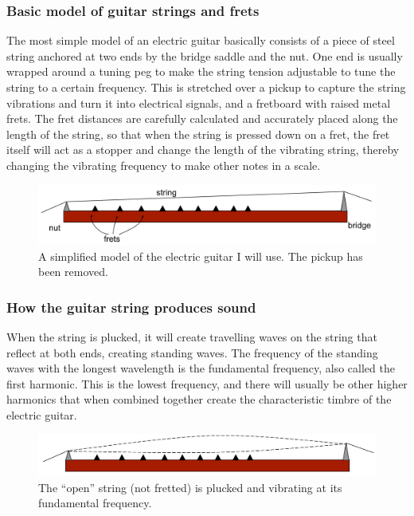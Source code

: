 \documentclass[11pt]{article}
\begin{document}
\begin{flushleft}
            \subsubsection*{Basic model of guitar strings and frets}
                The most simple model of an electric guitar basically consists of a piece of steel string anchored at two ends by the bridge saddle and the nut. One end is usually wrapped around a tuning peg to make the string tension adjustable to tune the string to a certain frequency. This is stretched over a pickup to capture the string vibrations and turn it into electrical signals, and a fretboard with raised metal frets. The fret distances are carefully calculated and accurately placed along the length of the string, so that when the string is pressed down on a fret, the fret itself will act as a stopper and change the length of the vibrating string, thereby changing the vibrating frequency to make other notes in a scale. 
                \begin{figure}[h]
                    \includegraphics[width=\textwidth]{fig1.png}
                    \caption{A simplified model of the electric guitar I will use. The pickup has been removed.}\label{fig1}
                \end{figure} 
                \FloatBarrier
            \subsubsection*{How the guitar string produces sound}
                When the string is plucked, it will create travelling waves on the string that reflect at both ends, creating standing waves. The frequency of the standing waves with the longest wavelength is the fundamental frequency, also called the first harmonic. This is the lowest frequency, and there will usually be other higher harmonics that when combined together create the characteristic timbre of the electric guitar. 
                \begin{figure}[h]
                    \includegraphics[width=\textwidth]{fig2.png}
                    \caption{The “open” string (not fretted) is plucked and vibrating at its fundamental frequency.}\label{fig2}
                \end{figure} 
            

\end{flushleft}
\end{document}
